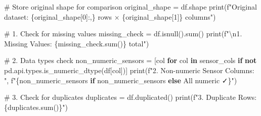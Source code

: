 \documentclass[
  letterpaper,
  DIV=11,
  numbers=noendperiod]{scrartcl}
\newenvironment{Shaded}{\begin{snugshade}}{\end{snugshade}}
\newcommand{\BuiltInTok}[1]{\textcolor[rgb]{0.00,0.23,0.31}{#1}}
\newcommand{\CharTok}[1]{\textcolor[rgb]{0.13,0.47,0.30}{#1}}
\newcommand{\CommentTok}[1]{\textcolor[rgb]{0.37,0.37,0.37}{#1}}
\newcommand{\ControlFlowTok}[1]{\textcolor[rgb]{0.00,0.23,0.31}{\textbf{#1}}}
\newcommand{\DecValTok}[1]{\textcolor[rgb]{0.68,0.00,0.00}{#1}}
\newcommand{\KeywordTok}[1]{\textcolor[rgb]{0.00,0.23,0.31}{\textbf{#1}}}
\newcommand{\NormalTok}[1]{\textcolor[rgb]{0.00,0.23,0.31}{#1}}
\newcommand{\OperatorTok}[1]{\textcolor[rgb]{0.37,0.37,0.37}{#1}}
\newcommand{\SpecialCharTok}[1]{\textcolor[rgb]{0.37,0.37,0.37}{#1}}
\newcommand{\SpecialStringTok}[1]{\textcolor[rgb]{0.13,0.47,0.30}{#1}}
\newcommand{\StringTok}[1]{\textcolor[rgb]{0.13,0.47,0.30}{#1}}
\renewenvironment{Shaded}{%
  \begin{tcolorbox}[%
    enhanced,%
    colback=codebg,%
    colframe=codebg,%
    borderline west={3pt}{0pt}{sectionblue},%
    fontupper=\small\ttfamily,%
    boxrule=0pt,%
    arc=0pt,%
    boxsep=5pt,%
    left=2mm,%
    right=2mm,%
    top=2mm,%
    bottom=2mm%
  ]%
}{%
  \end{tcolorbox}%
}
\begin{document}
\begin{Shaded}
\begin{Highlighting}[]

\CommentTok{\# Store original shape for comparison}
\NormalTok{original\_shape }\OperatorTok{=}\NormalTok{ df.shape}
\BuiltInTok{print}\NormalTok{(}\SpecialStringTok{f"Original dataset: }\SpecialCharTok{\{}\NormalTok{original\_shape[}\DecValTok{0}\NormalTok{]}\SpecialCharTok{:,\}}\SpecialStringTok{ rows × }\SpecialCharTok{\{}\NormalTok{original\_shape[}\DecValTok{1}\NormalTok{]}\SpecialCharTok{\}}\SpecialStringTok{ columns"}\NormalTok{)}

\CommentTok{\# 1. Check for missing values}
\NormalTok{missing\_check }\OperatorTok{=}\NormalTok{ df.isnull().}\BuiltInTok{sum}\NormalTok{()}
\BuiltInTok{print}\NormalTok{(}\SpecialStringTok{f"}\CharTok{\textbackslash{}n}\SpecialStringTok{1. Missing Values: }\SpecialCharTok{\{}\NormalTok{missing\_check}\SpecialCharTok{.}\BuiltInTok{sum}\NormalTok{()}\SpecialCharTok{\}}\SpecialStringTok{ total"}\NormalTok{)}

\CommentTok{\# 2. Data types check}
\NormalTok{non\_numeric\_sensors }\OperatorTok{=}\NormalTok{ [col }\ControlFlowTok{for}\NormalTok{ col }\KeywordTok{in}\NormalTok{ sensor\_cols }
                       \ControlFlowTok{if} \KeywordTok{not}\NormalTok{ pd.api.types.is\_numeric\_dtype(df[col])]}
\BuiltInTok{print}\NormalTok{(}\SpecialStringTok{f"2. Non{-}numeric Sensor Columns: "}\NormalTok{,}
      \SpecialStringTok{f"}\SpecialCharTok{\{}\NormalTok{non\_numeric\_sensors }\ControlFlowTok{if}\NormalTok{ non\_numeric\_sensors }\ControlFlowTok{else} \StringTok{\textquotesingle{}All numeric ✓\textquotesingle{}}\SpecialCharTok{\}}\SpecialStringTok{"}\NormalTok{)}

\CommentTok{\# 3. Check for duplicates}
\NormalTok{duplicates }\OperatorTok{=}\NormalTok{ df.duplicated()}
\BuiltInTok{print}\NormalTok{(}\SpecialStringTok{f"3. Duplicate Rows: }\SpecialCharTok{\{}\NormalTok{duplicates}\SpecialCharTok{.}\BuiltInTok{sum}\NormalTok{()}\SpecialCharTok{\}}\SpecialStringTok{"}\NormalTok{)}


\end{Highlighting}
\end{Shaded}
\end{document}

